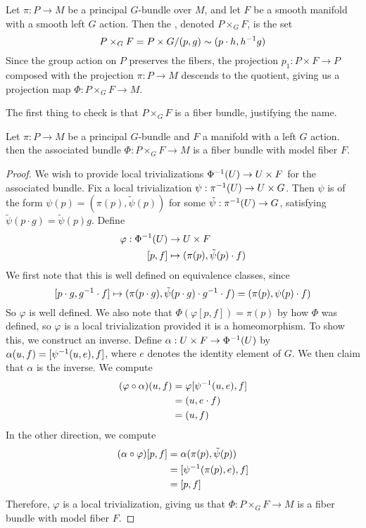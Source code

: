 %
\begin{defn}
Let $\pi : P \to M$ be a principal $G$-bundle over $M$, and let $F$ be a
smooth manifold with a smooth left $G$ action. Then the , denoted $P \times_G F$, is the set
\[
P \times_G F = P \times G / (p,g) \sim (p\cdot h, h^{-1} g)
\]
Since the group action on $P$ preserves the fibers, the projection
$p_1 : P \times F \to P$ composed with the projection $\pi : P \to M$
descends to the quotient, giving us a projection map
$\Phi : P \times_G F \to M$.
\end{defn}
%
The first thing to check is that $P \times_G F$ is a fiber bundle, justifying
the name.
%
\begin{prop}
Let $\pi : P \to M$ be a principal $G$-bundle and $F$ a manifold with a left $G$ action.
then the associated bundle $ \Phi : P \times_G F \to M$ is a fiber bundle with
model fiber $F$.
\end{prop}
%
\begin{proof}
We wish to provide local trivializations  $\Phi^{-1}(U) \to U \times F$ for the
associated bundle. Fix a local trivialization  $\psi : \pi^{-1}(U) \to U \times G$.
Then $\psi$ is of the form $\psi(p) = (\pi(p), \tilde{\psi}(p))$ for some
$\tilde{\psi} : \pi^{-1}(U) \to G$, satisfying $\tilde{\psi}(p\cdot g) = \tilde{\psi}(p)g$.
Define
\begin{align*}
\varphi : \Phi^{-1}(U) & \to U \times F                           \\
[p,f]                 & \mapsto (\pi(p), \tilde{\psi}(p)\cdot f)
\end{align*}
We first note that this is well defined on equivalence classes, since
\[
[p\cdot g, g^{-1} \cdot f] \mapsto (\pi(p \cdot g), \tilde{\psi}(p \cdot g)
\cdot g^{-1} \cdot f)
= (\pi(p), \psi(p)\cdot f)
\]
So $\varphi$ is well defined. We also note that $\Phi(\varphi[p,f]) = \pi(p)$
by how $\Phi$ was defined, so $\varphi$ is a local trivialization provided
it is a homeomorphism. To show this, we construct an inverse.
Define $\alpha : U \times F \to \Phi^{-1}(U)$
by $\alpha(u,f) = [\psi^{-1}(u,e), f]$, where $e$ denotes the identity element
of $G$. We then claim that $\alpha$ is the inverse. We compute
%
\begin{align*}
(\varphi \circ \alpha)(u,f) & = \varphi[\psi^{-1}(u,e),f] \\
                            & = (u, e\cdot f)            \\
                            & = (u,f)
\end{align*}
%
In the other direction, we compute
%
\begin{align*}
(\alpha \circ \varphi)[p,f] & = \alpha(\pi(p), \tilde{\psi}(p)) \\
                            & = [\psi^{-1}(\pi(p), e), f]        \\
                            & = [p, f]
\end{align*}
%
Therefore, $\varphi$ is a local trivialization, giving us that
$\Phi: P \times_G F \to M$ is a fiber bundle with model fiber $F$.
%
\end{proof}
